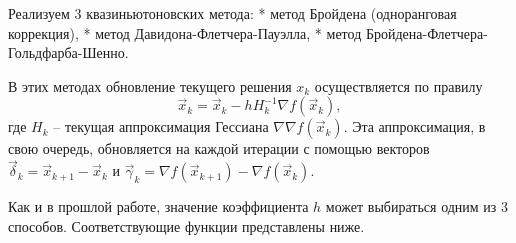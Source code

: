 \documentclass[11pt]{article}
\begin{document}
    Реализуем 3 квазиньютоновских метода: * метод Бройдена (одноранговая
коррекция), * метод Давидона-Флетчера-Пауэлла, * метод
Бройдена-Флетчера-Гольдфарба-Шенно.

В этих методах обновление текущего решения \(x_k\) осуществляется по
правилу \begin{equation*}
    \vec{x}_k = \vec{x}_k - h H_k^{-1} \nabla{f(\vec{x}_k)},
\end{equation*} где \(H_k\) -- текущая аппроксимация Гессиана
\(\nabla\nabla{f(\vec{x}_k)}\). Эта аппроксимация, в свою очередь,
обновляется на каждой итерации с помощью векторов
\(\vec{\delta}_k = \vec{x}_{k+1} - \vec{x}_k\) и
\(\vec{\gamma}_k = \nabla{f(\vec{x}_{k+1})} - \nabla{f(\vec{x}_k)}\).

Как и в прошлой работе, значение коэффициента \(h\) может выбираться
одним из 3 способов. Соответствующие функции представлены ниже.
    \newpage
\end{document}
